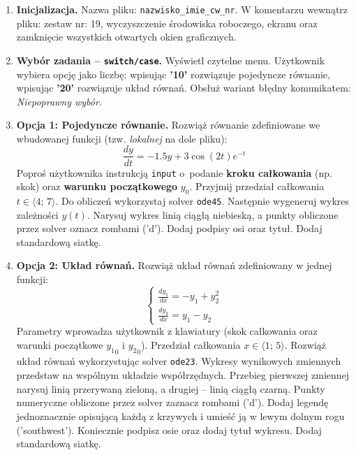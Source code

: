 \documentclass[a4paper,11pt]{article}
\begin{document}
\begin{enumerate}[leftmargin=*, label=\textbf{\arabic*.}, itemsep=2pt]

  \item \textbf{Inicjalizacja.}
    Nazwa pliku: \texttt{nazwisko\_imie\_cw\_nr}. W komentarzu wewnątrz pliku: zestaw nr: 19, wyczyszczenie środowiska roboczego, ekranu oraz zamknięcie wszystkich otwartych okien graficznych.

  \item \textbf{Wybór zadania -- \texttt{switch/case}.}
    Wyświetl czytelne menu. Użytkownik wybiera opcję jako liczbę: wpisując \textbf{'10'} rozwiązuje pojedyncze równanie, wpisując \textbf{'20'} rozwiązuje układ równań. Obsłuż wariant błędny komunikatem: \textit{Niepoprawny wybór}.

  \item \textbf{Opcja 1: Pojedyncze równanie.}
    Rozwiąż równanie zdefiniowane we wbudowanej funkcji (tzw. \textit{lokalnej} na dole pliku):
    \[ \frac{dy}{dt} = -1.5y + 3\cos(2t)e^{-t} \]
    Poproś użytkownika instrukcją \texttt{input} o~podanie \textbf{kroku całkowania} (np. skok) oraz \textbf{warunku początkowego} $y_0$. Przyjmij przedział całkowania $t \in \langle 4;\,7 \rangle$.
    Do obliczeń wykorzystaj solver \texttt{ode45}. Następnie wygeneruj wykres zależności $y(t)$. Narysuj wykres linią ciągłą niebieską, a punkty obliczone przez solver oznacz rombami ('d'). Dodaj podpisy osi oraz tytuł. Dodaj standardową siatkę.

  \item \textbf{Opcja 2: Układ równań.}
    Rozwiąż układ równań zdefiniowany w jednej funkcji:\\[-0.5em]
    \[
    \begin{cases}
      \frac{dy_1}{dx} = -y_1 + y_2^2 \\
      \frac{dy_2}{dx} = y_1 - y_2
    \end{cases}
    \]
    Parametry wprowadza użytkownik z klawiatury (skok całkowania oraz warunki początkowe $ {y_1}_{0} $ i $ {y_2}_{0} $). Przedział całkowania $x \in \langle 1;\,5 \rangle$.
    Rozwiąż układ równań wykorzystując solver \texttt{ode23}. Wykresy wynikowych zmiennych przedstaw na wspólnym układzie współrzędnych. Przebieg pierwszej zmiennej narysuj linią przerywaną zieloną, a drugiej -- linią ciągłą czarną. Punkty numeryczne obliczone przez solver zaznacz rombami ('d'). Dodaj legendę jednoznacznie opisującą każdą z krzywych i umieść ją w lewym dolnym rogu ('southwest'). Koniecznie podpisz osie oraz dodaj tytuł wykresu. Dodaj standardową siatkę.

\end{enumerate}
\end{document}
